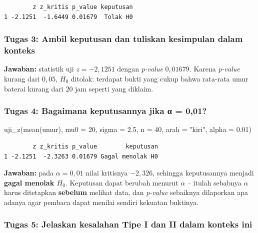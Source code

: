 \documentclass[
  indonesian,
  letterpaper,
]{book}
\newenvironment{Shaded}{\begin{snugshade}}{\end{snugshade}}
\newcommand{\AttributeTok}[1]{\textcolor[rgb]{0.40,0.45,0.13}{#1}}
\newcommand{\DecValTok}[1]{\textcolor[rgb]{0.68,0.00,0.00}{#1}}
\newcommand{\FloatTok}[1]{\textcolor[rgb]{0.68,0.00,0.00}{#1}}
\newcommand{\FunctionTok}[1]{\textcolor[rgb]{0.28,0.35,0.67}{#1}}
\newcommand{\NormalTok}[1]{\textcolor[rgb]{0.00,0.23,0.31}{#1}}
\newcommand{\StringTok}[1]{\textcolor[rgb]{0.13,0.47,0.30}{#1}}
\begin{document}
\begin{verbatim}
        z z_kritis p_value keputusan
1 -2.1251  -1.6449 0.01679  Tolak H0
\end{verbatim}

\subsubsection{Tugas 3: Ambil keputusan dan tuliskan kesimpulan dalam
konteks}\label{tugas-3-ambil-keputusan-dan-tuliskan-kesimpulan-dalam-konteks}

\textbf{Jawaban:} statistik uji \(z = -2{,}1251\) dengan \emph{p-value}
\(0{,}01679\). Karena \emph{p-value} kurang dari \(0{,}05\), \(H_0\)
ditolak: terdapat bukti yang cukup bahwa rata-rata umur baterai kurang
dari \(20\) jam seperti yang diklaim.

\subsubsection{Tugas 4: Bagaimana keputusannya jika α =
0,01?}\label{tugas-4-bagaimana-keputusannya-jika-ux3b1-001}

\begin{Shaded}
\begin{Highlighting}[]
\FunctionTok{uji\_z}\NormalTok{(}\FunctionTok{mean}\NormalTok{(umur), }\AttributeTok{mu0 =} \DecValTok{20}\NormalTok{, }\AttributeTok{sigma =} \FloatTok{2.5}\NormalTok{, }\AttributeTok{n =} \DecValTok{40}\NormalTok{, }\AttributeTok{arah =} \StringTok{"kiri"}\NormalTok{, }\AttributeTok{alpha =} \FloatTok{0.01}\NormalTok{)}
\end{Highlighting}
\end{Shaded}

\begin{verbatim}
        z z_kritis p_value        keputusan
1 -2.1251  -2.3263 0.01679 Gagal menolak H0
\end{verbatim}

\textbf{Jawaban:} pada \(\alpha = 0{,}01\) nilai kritisnya \(-2{,}326\),
sehingga keputusannya menjadi \textbf{gagal menolak \(H_0\)}. Keputusan
dapat berubah menurut \(\alpha\) -- itulah sebabnya \(\alpha\) harus
ditetapkan \textbf{sebelum} melihat data, dan \emph{p-value} sebaiknya
dilaporkan apa adanya agar pembaca dapat menilai sendiri kekuatan
buktinya.

\subsubsection{Tugas 5: Jelaskan kesalahan Tipe I dan II dalam konteks
ini}\label{tugas-5-jelaskan-kesalahan-tipe-i-dan-ii-dalam-konteks-ini}
\end{document}
